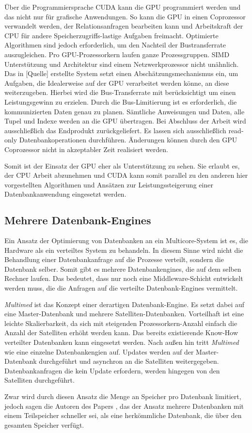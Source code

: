 Über die Programmiersprache CUDA kann die GPU programmiert werden und das nicht nur für grafische Anwendungen. So kann die GPU in einen Coprozessor verwandelt werden, der Relationsanfragen bearbeiten kann und Arbeitskraft der CPU für andere Speicherzugriffs-lastige Aufgaben freimacht. \cite{HE} Optimierte Algorithmen sind jedoch erforderlich, um den Nachteil der Bustransferrate auszugleichen. Pro GPU-Prozessorkern laufen ganze Prozessgruppen. SIMD Unterstützung und Architektur sind einem Netzwerkprozessor nicht unähnlich. Das in [Quelle] erstellte System setzt einen Abschätzungsmechanismus ein, um Aufgaben, die Idealerweise auf der GPU verarbeitet werden könne, an diese weiterzugeben. Hierbei wird die Bus-Transferrate mit berücksichtigt um einen Leistungsgewinn zu erzielen. Durch die Bus-Limitierung ist es erforderlich, die kommunizierten Daten genau zu planen. Sämtliche Anweisungen und Daten, alle Tupel und Indexe werden an die GPU übertragen. Bei Abschluss der Arbeit wird ausschließlich das Endprodukt zurückgeliefert. Es lassen sich ausschließlich read-only Datenbankoperationen durchführen. Änderungen können durch den GPU Coprozessor nicht in akzeptabler Zeit realisiert werden.

Somit ist der Einsatz der GPU eher als Unterstützung zu sehen. Sie erlaubt es, der CPU Arbeit abzunehmen und CUDA kann somit parallel zu den anderen hier vorgestellten Algorithmen und Ansätzen zur Leistungssteigerung einer Datenbankanwendung eingesetzt werden.


\subsection{Mehrere Datenbank-Engines}
\label{sec:DBEngines}

Ein Ansatz der Optimierung von Datenbanken an ein Multicore-System ist es, die Hardware als ein verteiltes System zu behandeln. In diesem Sinne wird nicht die Behandlung einer Datenbankanfrage auf die Prozesse verteilt, sondern die Datenbank selber. Somit gibt es mehrere Datenbankengines, die auf dem selben Rechner laufen. Das bedeutet, dass nur noch eine Middleware-Schicht entwickelt werden muss, die die Anfragen auf die verteilte Datenbank-Engines vermittelt.

\textit{Multimed} \cite{SALOMIE} ist das Konzept einer derartigen Datenbank-Engine. Es setzt dabei auf eine Master-Datenbank und mehrere Satelliten-Datenbanken. Vorteilhaft ist eine leichte Skalierbarkeit, da sich mit steigenden Prozessorkern-Anzahl einfach die Anzahl der Satelliten erhöht werden kann. Das bereits existierende Know-How verteilter Datenbanken kann eingesetzt werden. Nach außen hin tritt \textit{Multimed} wie eine einzelne Datenbankengien auf. Updates werden auf der Master-Datenbank durchgeführt und asynchron an die Satelliten weitergegeben. Datenbankanfragen die kein Update erfordern, werden hingegen von den Satelliten durchgeführt. 

Zwar wird durch diesen Ansatz die Menge an Speicher pro Datenbank limitiert, jedoch sagen die Autoren des Papers \cite{SALOMIE}, das der Ansatz mehrere Datenbanken mit einem Teilspeicher schneller sei, als eine herkömmliche Datenbank, die über den gesamten Speicher verfügt.